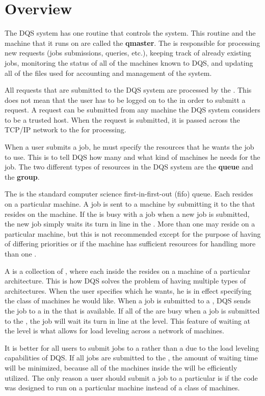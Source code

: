 \section{Overview}

The DQS system has one routine that controls the system.  This routine
and the machine that it runs on are called the {\bf qmaster}.  The
\qmaster is responsible for processing new requests (jobs submissions,
queries, etc.), keeping track of already existing jobs, monitoring the
status of all of the machines known to DQS, and updating all of the
files used for accounting and management of the system.

All requests that are submitted to the DQS system are processed by the
\qmaster.  This does not mean that the user has to be logged on to the
\qmaster in order to submitt a request.  A request can be submitted
from any machine the DQS system considers to be a trusted host.  When
the request is submitted, it is passed across the TCP/IP network to
the \qmaster for processing.

When a user submits a job, he must specify the resources that he wants
the job to use.  This is to tell DQS how many and what kind of
machines he needs for the job.  The two different types of resources
in the DQS system are the {\bf queue} and the {\bf group}.

The \queue is the standard computer science first-in-first-out (fifo)
queue.  Each \queue resides on a particular machine.  A job is sent
to a machine by submitting it to the \queue that resides on the
machine.  If the \queue is busy with a job when a new job is submitted,
the new job simply waits its turn in line in the \queue.  More than one
\queue may reside on a particular machine, but this is not recommended
except for the purpose of having \queues of differing priorities or if the
machine has sufficient resources for handling more than one \queue.

A \group is a collection of \queues, where each \queue inside the \group
resides on a machine of a particular architecture.  This is how DQS
solves the problem of having multiple types of architectures.  When
the user specifies which \group he wants, he is in effect specifying
the class of machines he would like.  When a job is submitted to a
\group, DQS sends the job to a \queue in the \group that is available.
If all of the \queues are busy when a job is submitted to the \group,
the job will wait its turn in line at the \group level.  This feature of
waiting at the \group level is what allows for load leveling across a
network of machines.

It is better for all users to submit jobs to a \group rather than a
\queue due to the load leveling capabilities of DQS.  If all jobs are
submitted to the \group, the amount of waiting time will be minimized,
because all of the machines inside the \group will be efficiently
utilized.  The only reason a user should submit a job to a
particular \queue is if the code was designed to run on a particular
machine instead of a class of machines.

